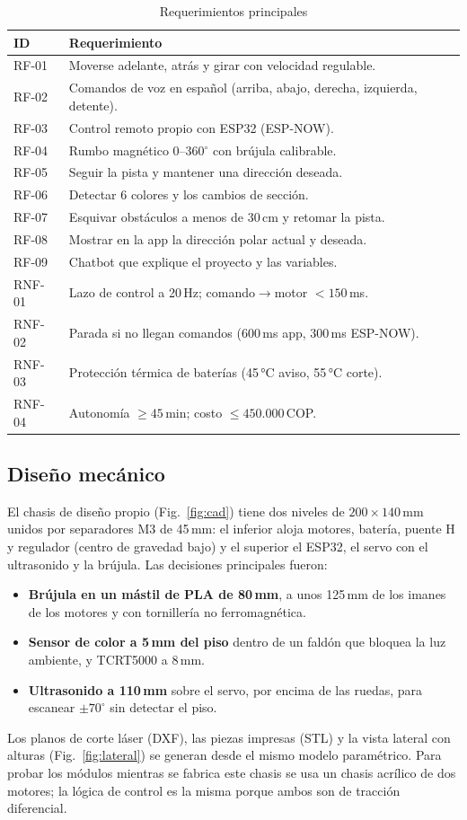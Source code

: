 \documentclass[10pt,a4paper,twocolumn]{article}
\newcommand{\ra}{$\rightarrow$}
\begin{document}
\begin{table}[!t]
\caption{Requerimientos principales}\label{tab:req}
\centering\scriptsize
\begin{tabularx}{\columnwidth}{@{}l>{\raggedright\arraybackslash}X@{}}
\toprule
\textbf{ID} & \textbf{Requerimiento}\\
\midrule
RF-01 & Moverse adelante, atrás y girar con velocidad regulable.\\
RF-02 & Comandos de voz en español (arriba, abajo, derecha, izquierda, detente).\\
RF-03 & Control remoto propio con ESP32 (ESP-NOW).\\
RF-04 & Rumbo magnético 0--360$^\circ$ con brújula calibrable.\\
RF-05 & Seguir la pista y mantener una dirección deseada.\\
RF-06 & Detectar 6 colores y los cambios de sección.\\
RF-07 & Esquivar obstáculos a menos de 30\,cm y retomar la pista.\\
RF-08 & Mostrar en la app la dirección polar actual y deseada.\\
RF-09 & Chatbot que explique el proyecto y las variables.\\
RNF-01 & Lazo de control a 20\,Hz; comando\ra motor $<150$\,ms.\\
RNF-02 & Parada si no llegan comandos (600\,ms app, 300\,ms ESP-NOW).\\
RNF-03 & Protección térmica de baterías (45\,°C aviso, 55\,°C corte).\\
RNF-04 & Autonomía $\geq45$\,min; costo $\leq450.000$\,COP.\\
\bottomrule
\end{tabularx}
\end{table}

\subsection{Diseño mecánico}
El chasis de diseño propio (Fig.~\ref{fig:cad}) tiene dos niveles de $200\times140$\,mm unidos por separadores M3 de 45\,mm: el inferior aloja motores, batería, puente H y regulador (centro de gravedad bajo) y el superior el ESP32, el servo con el ultrasonido y la brújula. Las decisiones principales fueron:
\begin{itemize}
\item \textbf{Brújula en un mástil de PLA de 80\,mm}, a unos 125\,mm de los imanes de los motores y con tornillería no ferromagnética.
\item \textbf{Sensor de color a 5\,mm del piso} dentro de un faldón que bloquea la luz ambiente, y TCRT5000 a 8\,mm.
\item \textbf{Ultrasonido a 110\,mm} sobre el servo, por encima de las ruedas, para escanear $\pm70^\circ$ sin detectar el piso.
\end{itemize}
Los planos de corte láser (DXF), las piezas impresas (STL) y la vista lateral con alturas (Fig.~\ref{fig:lateral}) se generan desde el mismo modelo paramétrico. Para probar los módulos mientras se fabrica este chasis se usa un chasis acrílico de dos motores; la lógica de control es la misma porque ambos son de tracción diferencial.
\end{document}
